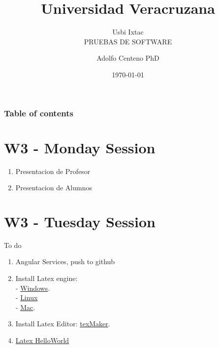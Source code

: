 \documentclass{beamer}
\begin{document}
\title{Universidad Veracruzana}  
\subtitle{Usbi Ixtac\\PRUEBAS DE SOFTWARE}
\author{Adolfo Centeno PhD}
\date{\today} 

\begin{frame}
\titlepage
\end{frame}

\begin{frame}\frametitle{Table of contents}
\tableofcontents
\end{frame} 


\section{W3 - Monday Session  }

\begin{frame} 

\begin{enumerate}
\item
 Presentacion de Profesor
\item
 Presentacion de Alumnos
\end{enumerate} 


\end{frame}


\section{W3 - Tuesday Session }

\begin{frame}

To do

\begin{enumerate}
\item
	Angular Services, push to github 
\item
    Install Latex engine:  \\
    - \href{https://git-scm.com/downloads}{Windows}. \\
    - \href{https://git-scm.com/downloads}{Linux} \\
    - \href{https://git-scm.com/downloads}{Mac}. 
\item
	Install Latex Editor: \href{https://git-scm.com/downloads}{texMaker}.	
\item
	\href{https://git-scm.com/downloads}{Latex HelloWorld} 

	

\end{enumerate} 

\end{frame}
\end{document}
